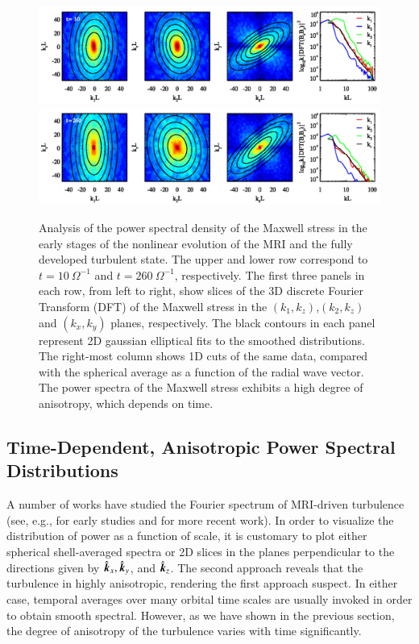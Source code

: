 \documentclass[]{emulateapj}
\newcommand\bb[1]{\mbox{\boldmath{$#1$}}}
\begin{document}
\begin{figure}[t]
\begin{center}
\includegraphics[width= \textwidth]{f16.png}
\includegraphics[width= \textwidth]{f17.png}
\caption{
Analysis of the power spectral density of the Maxwell stress in the 
early stages of the nonlinear evolution of the MRI and the fully developed 
turbulent state. The upper and lower row correspond to $t=10~\Omega^{-1}$  
and $t=260~\Omega^{-1}$, respectively.
The first three panels in each row, from left to right, show slices of the 3D discrete 
Fourier Transform (DFT) of the Maxwell stress in the $(k_1,k_z)$,$(k_2,k_z)$ 
and $(k_x,k_y)$ planes, respectively. 
The black contours in each panel represent 2D gaussian elliptical fits to the 
smoothed distributions. The right-most column shows 1D cuts of the same data, compared with the spherical average as a function of the radial wave vector. 
The power spectra of the Maxwell stress exhibits a high degree of anisotropy, which depends 
on time.
}
\label{cutsof3dfftstress}
\end{center}
\end{figure}

\subsection{Time-Dependent, Anisotropic Power Spectral Distributions}
\label{spectral}


A number of works have studied the Fourier spectrum of  MRI-driven turbulence
(see, e.g., \citealt{Hawley:1995gd} for early studies and \citealt{2010A&A...514L...5F,
Lesur:2011jh, 2014MNRAS.441.1855N} for more recent work). In order to visualize the distribution 
of power as a function of scale, it is customary to plot either spherical 
shell-averaged spectra or 2D slices in the planes perpendicular to the directions 
given by $\hat{\bb{k}}_x, \hat{\bb{k}}_y$, and $\hat{\bb{k}}_z$. 
The second approach reveals that the turbulence in highly 
anisotropic, rendering the first approach suspect. In either
case, temporal averages over many orbital time scales
are usually invoked in order to obtain smooth spectral.
However, as we have shown in the previous section, the degree of 
anisotropy of the turbulence varies with time significantly.
 
\end{document}
